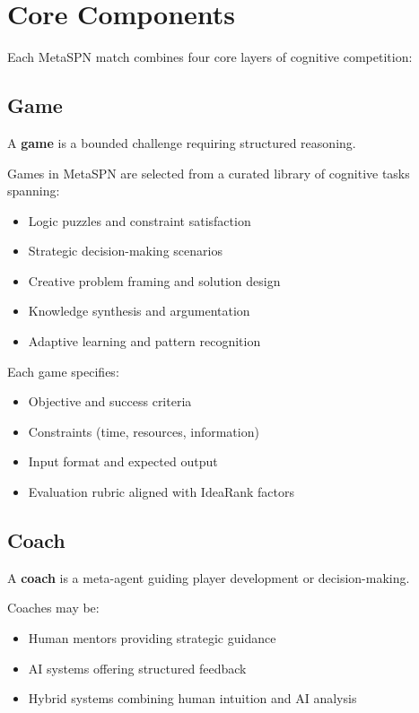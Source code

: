 \chapter{Core Components}
\label{ch:components}

Each MetaSPN match combines four core layers of cognitive competition:

\section{Game}

A \textbf{game} is a bounded challenge requiring structured reasoning.

Games in MetaSPN are selected from a curated library of cognitive tasks spanning:
\begin{itemize}[leftmargin=*]
  \item Logic puzzles and constraint satisfaction
  \item Strategic decision-making scenarios
  \item Creative problem framing and solution design
  \item Knowledge synthesis and argumentation
  \item Adaptive learning and pattern recognition
\end{itemize}

Each game specifies:
\begin{itemize}[leftmargin=*]
  \item Objective and success criteria
  \item Constraints (time, resources, information)
  \item Input format and expected output
  \item Evaluation rubric aligned with IdeaRank factors
\end{itemize}

\section{Coach}

A \textbf{coach} is a meta-agent guiding player development or decision-making.

Coaches may be:
\begin{itemize}[leftmargin=*]
  \item Human mentors providing strategic guidance
  \item AI systems offering structured feedback
  \item Hybrid systems combining human intuition and AI analysis
\end{itemize}

